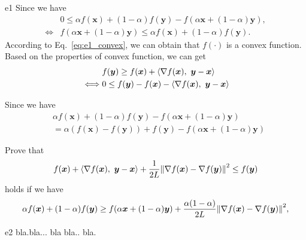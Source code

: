 \documentclass{article}
\newcommand{\xB}{\bm{x}}
\renewcommand{\grad}{\nabla}
\newcommand{\yB}{\bm{y}}
\begin{document}
\begin{PROOF}{e1}
    Since we have
    \begin{equation}\label{eq:e1_convex}
        \begin{aligned}
            &0 \leq \alpha f(\xB) + (1-\alpha) f(\yB) - f( \alpha \xB + (1-\alpha) \yB),\\
            \iff &f( \alpha \xB + (1-\alpha) \yB) \le \alpha f(\xB) + (1-\alpha) f(\yB).
        \end{aligned}
    \end{equation}    
    According to Eq.~\ref{eq:e1_convex}, we can obtain that \(f(\cdot)\) is a convex function. Based on the properties of convex function, we can get
    \begin{equation}\label{eq:e1_left_le}
        \begin{aligned}
            &f(\yB) \ge f(\xB) + \innerprod{\grad f(\xB)}{\yB - \xB}\\
            \iff & 0 \le f(\yB) - f(\xB) - \innerprod{\grad f(\xB)}{\yB - \xB}
        \end{aligned}
    \end{equation}

    Since we have
    \begin{equation}\label{eq:e1_part2}
        \begin{aligned}
            &\alpha f(\xB) + (1-\alpha) f(\yB) - f( \alpha \xB + (1-\alpha) \yB) \\
            &= \alpha (f(\xB) - f(\yB)) + f(\yB) - f( \alpha \xB + (1-\alpha) \yB)
        \end{aligned}
    \end{equation}
\end{PROOF}

\begin{excercise}\label{e2}
Prove that
\begin{equation} \nonumber 
	f(\xB) + \innerprod{\grad f(\xB)}{\yB - \xB} + \frac{1}{2L} \norm{\grad f(\xB) - \grad f(\yB)}^2 \leq f(\yB)
\end{equation}
holds if we have
\begin{equation} \nonumber 
\alpha f(\xB) + (1-\alpha) f(\yB) \geq f(\alpha \xB + (1-\alpha) \yB) \nonumber 
	+ \frac{\alpha(1-\alpha)}{2L} \norm{\grad f(\xB) - \grad f(\yB)}^2, \nonumber
\end{equation}
\end{excercise}

\begin{PROOF}{e2}
	bla.bla... bla bla.. bla.
\end{PROOF}
\end{document}

